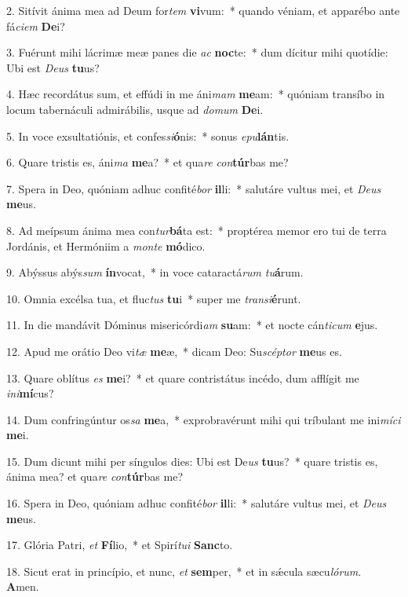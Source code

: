 2. Sitívit ánima mea ad Deum for\textit{tem} \textbf{vi}vum:~*  quando véniam, et apparébo ante fá\textit{ci}\textit{em} \textbf{De}i?\

3. Fuérunt mihi lácrimæ meæ panes die \textit{ac} \textbf{noc}te:~*  dum dícitur mihi quotídie: Ubi est \textit{De}\textit{us} \textbf{tu}us?\

4. Hæc recordátus sum, et effúdi in me áni\textit{mam} \textbf{me}am:~*  quóniam transíbo in locum tabernáculi admirábilis, usque ad \textit{do}\textit{mum} \textbf{De}i.\

5. In voce exsultatiónis, et confes\textit{si}\textbf{ó}nis:~*  sonus \textit{e}\textit{pu}\textbf{lán}tis.\

6. Quare tristis es, áni\textit{ma} \textbf{me}a?~*  et qua\textit{re} \textit{con}\textbf{túr}bas me?\

7. Spera in Deo, quóniam adhuc confité\textit{bor} \textbf{il}li:~*  salutáre vultus mei, et \textit{De}\textit{us} \textbf{me}us.\

8. Ad meípsum ánima mea con\textit{tur}\textbf{bá}ta est:~*  proptérea memor ero tui de terra Jordánis, et Hermóniim a \textit{mon}\textit{te} \textbf{mó}dico.\

9. Abýssus abýs\textit{sum} \textbf{ín}vocat,~*  in voce cataractá\textit{rum} \textit{tu}\textbf{á}rum.\

10. Omnia excélsa tua, et fluc\textit{tus} \textbf{tu}i~*  super me \textit{trans}\textit{i}\textbf{é}runt.\

11. In die mandávit Dóminus misericórdi\textit{am} \textbf{su}am:~*  et nocte cán\textit{ti}\textit{cum} \textbf{e}jus.\

12. Apud me orátio Deo vi\textit{tæ} \textbf{me}æ,~*  dicam Deo: Su\textit{scép}\textit{tor} \textbf{me}us es.\

13. Quare oblítus \textit{es} \textbf{me}i?~*  et quare contristátus incédo, dum afflígit me \textit{in}\textit{i}\textbf{mí}cus?\

14. Dum confringúntur os\textit{sa} \textbf{me}a,~*  exprobravérunt mihi qui tríbulant me ini\textit{mí}\textit{ci} \textbf{me}i.\

15. Dum dicunt mihi per síngulos dies: Ubi est De\textit{us} \textbf{tu}us?~*  quare tristis es, ánima mea? et qua\textit{re} \textit{con}\textbf{túr}bas me?\

16. Spera in Deo, quóniam adhuc confité\textit{bor} \textbf{il}li:~*  salutáre vultus mei, et \textit{De}\textit{us} \textbf{me}us.\

17. Glória Patri, \textit{et} \textbf{Fí}lio,~*  et Spirí\textit{tu}\textit{i} \textbf{Sanc}to.\

18. Sicut erat in princípio, et nunc, \textit{et} \textbf{sem}per,~*  et in sǽcula sæcu\textit{ló}\textit{rum}. \textbf{A}men.\

